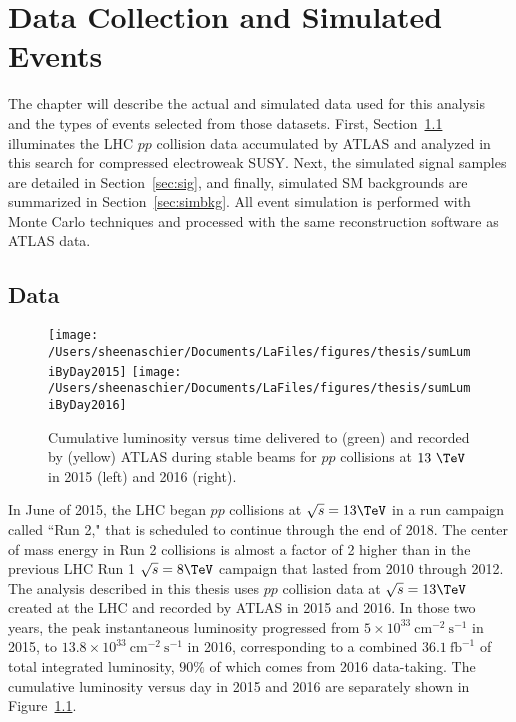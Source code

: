 \chapter{Data Collection and Simulated Events}
\label{ch:data}
The chapter will describe the actual and simulated data used for this analysis and the types of events selected from those datasets.  First, Section~\ref{sec:data} illuminates the LHC $pp$ collision data accumulated by ATLAS and analyzed in this search for compressed electroweak SUSY.  Next, the simulated signal samples are detailed in Section~\ref{sec:sig}, and finally, simulated SM backgrounds are summarized in Section~\ref{sec:simbkg}.  All event simulation is performed with Monte Carlo techniques and processed with the same reconstruction software as ATLAS data.  
 
\section{Data}
\label{sec:data}

 \begin{figure}[tbp]
 \texttt{[image: /Users/sheenaschier/Documents/LaFiles/figures/thesis/sumLumiByDay2015]}
 \texttt{[image: /Users/sheenaschier/Documents/LaFiles/figures/thesis/sumLumiByDay2016]}\\
 \caption{Cumulative luminosity versus time delivered to (green) and recorded by (yellow) ATLAS during stable beams for $pp$ collisions at $13~\TeV$ in 2015 (left) and 2016 (right).}
 \label{fig:lumi}
 \end{figure}
In June of 2015, the LHC began $pp$ collisions at $\sqrt{s}=13\TeV$ in a run campaign called ``Run 2," that is scheduled to continue through the end of 2018.  The center of mass energy in Run 2 collisions is almost a factor of 2 higher than in the previous LHC Run 1 $\sqrt{s}=8\TeV$ campaign that lasted from 2010 through 2012. The analysis described in this thesis uses $pp$ collision data at $\sqrt{s}=13\TeV$ created at the LHC and recorded by ATLAS in 2015 and 2016.  In those two years, the peak instantaneous luminosity progressed from $5\times10^{33}~\mathrm{cm}^{-2}~\mathrm{s}^{-1}$ in 2015, to $13.8\times10^{33}~\mathrm{cm}^{-2}~\mathrm{s}^{-1}$ in 2016, corresponding to a combined $36.1~\mathrm{fb}^{-1}$ of total integrated luminosity, $90\%$ of which comes from 2016 data-taking.  The cumulative luminosity versus day in 2015 and 2016 are separately shown in Figure~\ref{fig:lumi}.

